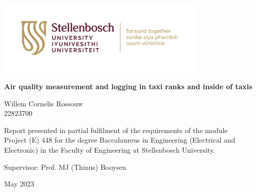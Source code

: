 \graphicspath{{frontmatter/fig/}}

\begin{titlepage}
	\begin{center}
		
		\includegraphics[width=10cm]{SU_corporate_horizontal_with_slogan_RGB}
		
		\vfill
		
		{\rmfamily  \bfseries \huge Air quality measurement and logging in taxi ranks and inside of taxis \par}
		
		\vfill
		
		{\large {\Large Willem Cornelis Rossouw} \\ 22823700 \par}
		
		\vfill
		
		\vfill
		
		 {\large Report presented in partial fulfilment of the requirements of the module \\ Project (E) 448 for the degree Baccalaureus in Engineering (Electrical and Electronic) in the Faculty of Engineering at Stellenbosch University. \par}



		
		\vfill
		
		{\large {Supervisor}: Prof. MJ (Thinus) Booysen } %
		
		\vfill
		
		{\Large May 2023}
	\end{center}
\end{titlepage}
